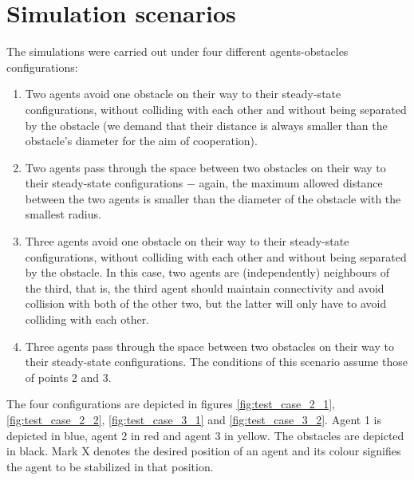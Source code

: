 \section{Simulation scenarios}

The simulations were carried out under four different agents-obstacles
configurations:

\begin{enumerate}
  \item Two agents avoid one obstacle on their way to their
    steady-state configurations, without colliding with each other and without
    being separated by the obstacle (we demand that their distance is always
    smaller than the obstacle's diameter for the aim of cooperation).
  \item Two agents pass through the space between two obstacles
    on their way to their steady-state configurations $-$ again, the maximum
    allowed distance between the two agents is smaller than the diameter
    of the obstacle with the smallest radius.
  \item Three agents avoid one obstacle on their way to their
    steady-state configurations, without colliding with each other and without
    being separated by the obstacle. In this case, two agents are
    (independently) neighbours of the third, that is, the third agent should
    maintain connectivity and avoid collision with both of the other two,
    but the latter will only have to avoid colliding with each other.
  \item Three agents pass through the space between two obstacles
    on their way to their steady-state configurations. The conditions of this
    scenario assume those of points 2 and 3.
\end{enumerate}

The four configurations are depicted in figures \eqref{fig:test_case_2_1},
\eqref{fig:test_case_2_2}, \eqref{fig:test_case_3_1} and
\eqref{fig:test_case_3_2}. Agent 1 is depicted in blue, agent 2 in
red and agent 3 in yellow. The obstacles are depicted in black. Mark X
denotes the desired position of an agent and its colour signifies the agent
to be stabilized in that position.


\noindent{}

